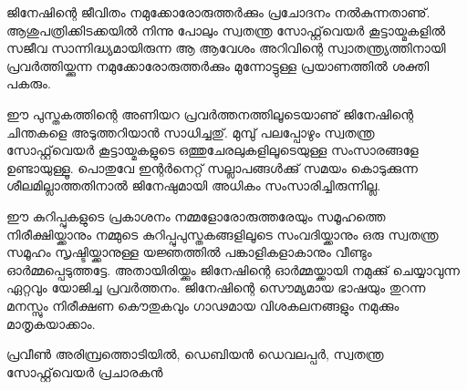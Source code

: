 
ജിനേഷിന്റെ ജീവിതം നമുക്കോരോരുത്തര്‍ക്കും പ്രചോദനം നല്‍കുന്നതാണു്. ആശുപത്രിക്കിടക്കയില്‍ നിന്നു പോലും സ്വതന്ത്ര സോഫ്റ്റ്‌വെയര്‍ കൂട്ടായ്മകളില്‍ സജീവ സാന്നിദ്ധ്യമായിരുന്ന ആ ആവേശം അറിവിന്റെ സ്വാതന്ത്ര്യത്തിനായി പ്രവര്‍ത്തിയ്ക്കുന്ന നമുക്കോരോരുത്തര്‍ക്കും മുന്നോട്ടുള്ള പ്രയാണത്തില്‍ ശക്തി പകരും. 

ഈ പുസ്തകത്തിന്റെ അണിയറ പ്രവര്‍ത്തനത്തിലൂടെയാണു് ജിനേഷിന്റെ ചിന്തകളെ അടുത്തറിയാന്‍ സാധിച്ചതു്. മുമ്പു് പലപ്പോഴും സ്വതന്ത്ര സോഫ്റ്റ്‌വെയര്‍ കൂട്ടായ്മകളുടെ ഒത്തുചേരലുകളിലൂടെയുള്ള സംസാരങ്ങളേ ഉണ്ടായുള്ളൂ. പൊതുവേ ഇന്റര്‍നെറ്റ് സല്ലാപങ്ങള്‍ക്കു് സമയം കൊടുക്കുന്ന ശീലമില്ലാത്തതിനാല്‍ ജിനേഷുമായി അധികം സംസാരിച്ചിരുന്നില്ല.

ഈ കുറിപ്പുകളുടെ പ്രകാശനം നമ്മളോരോരുത്തരേയും സമൂഹത്തെ നിരീക്ഷിയ്ക്കാനും നമ്മുടെ കുറിപ്പുപുസ്തകങ്ങളിലൂടെ സംവദിയ്ക്കാനും ഒരു സ്വതന്ത്ര സമൂഹം സൃഷ്ടിയ്ക്കാനുള്ള യജ്ഞത്തില്‍ പങ്കാളികളാകാനും വീണ്ടും ഓര്‍മ്മപ്പെടുത്തട്ടേ. അതായിരിയ്ക്കും ജിനേഷിന്റെ ഓര്‍മ്മയ്ക്കായി നമുക്കു് ചെയ്യാവുന്ന ഏറ്റവും യോജിച്ച പ്രവര്‍ത്തനം. ജിനേഷിന്റെ സൌമ്യമായ ഭാഷയും തുറന്ന മനസ്സും നിരീക്ഷണ കൌതുകവും ഗാഢമായ വിശകലനങ്ങളും നമുക്കും മാതൃകയാക്കാം.

\hspace*{2em}പ്രവീണ്‍ അരിമ്പ്രത്തൊടിയില്‍, ഡെബിയന്‍ ഡെവലപ്പര്‍, സ്വതന്ത്ര സോഫ്റ്റ്‌വെയര്‍ പ്രചാരകന്‍
\newpage
